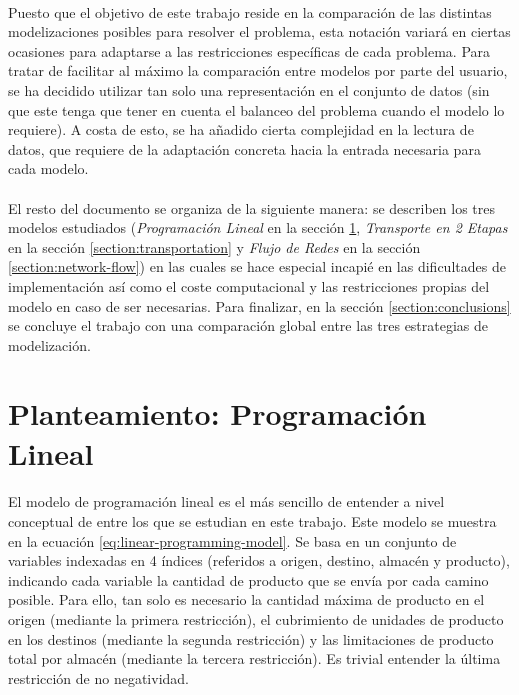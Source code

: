 \documentclass{article}
\begin{document}
    \paragraph{}
    Puesto que el objetivo de este trabajo reside en la comparación de las distintas modelizaciones posibles para resolver el problema, esta notación variará en ciertas ocasiones para adaptarse a las restricciones específicas de cada problema. Para tratar de facilitar al máximo la comparación entre modelos por parte del usuario, se ha decidido utilizar tan solo una representación en el conjunto de datos (sin que este tenga que tener en cuenta el balanceo del problema cuando el modelo lo requiere). A costa de esto, se ha añadido cierta complejidad en la lectura de datos, que requiere de la adaptación concreta hacia la entrada necesaria para cada modelo.

    \paragraph{}
    El resto del documento se organiza de la siguiente manera: se describen los tres modelos estudiados (\emph{Programación Lineal} en la sección \ref{section:linear-programming}, \emph{Transporte en 2 Etapas} en la sección \ref{section:transportation} y \emph{Flujo de Redes} en la sección \ref{section:network-flow}) en las cuales se hace especial incapié en las dificultades de implementación así como el coste computacional y las restricciones propias del modelo en caso de ser necesarias. Para finalizar, en la sección \ref{section:conclusions} se concluye el trabajo con una comparación global entre las tres estrategias de modelización.

  \section{Planteamiento: Programación Lineal}
  \label{section:linear-programming}

    \paragraph{}
    El modelo de programación lineal es el más sencillo de entender a nivel conceptual de entre los que se estudian en este trabajo. Este modelo se muestra en la ecuación \eqref{eq:linear-programming-model}. Se basa en un conjunto de variables indexadas en 4 índices (referidos a origen, destino, almacén y producto), indicando cada variable la cantidad de producto que se envía por cada camino posible. Para ello, tan solo es necesario la cantidad máxima de producto en el origen (mediante la primera restricción), el cubrimiento de unidades de producto en los destinos (mediante la segunda restricción) y las limitaciones de producto total por almacén (mediante la tercera restricción). Es trivial entender la última restricción de no negatividad.
\end{document}
